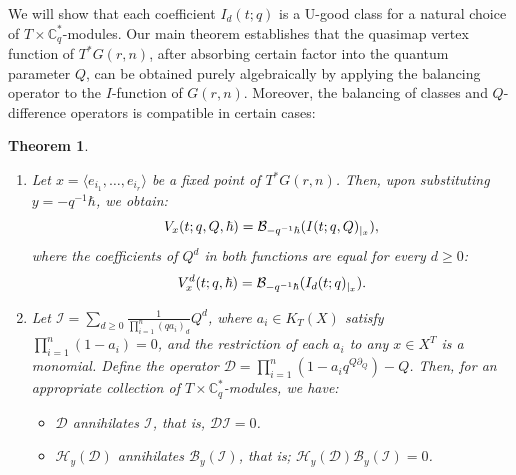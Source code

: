\documentclass{amsart}
\newtheorem{thm}{Theorem}[section]
\begin{document}
We will show that each coefficient $I_d(t;q)$ is a U-good class for a natural choice of $T \times \mathbb{C}^*_q$-modules. Our main theorem establishes that the quasimap vertex function of $T^*G(r,n)$, after absorbing certain factor into the quantum parameter $Q$, can be obtained purely algebraically by applying the balancing operator to the $I$-function of $G(r,n)$. Moreover, the balancing of classes and $Q$-difference operators is compatible in certain cases:
\begin{thm} 
\begin{enumerate}
    \item 
 Let  $x=\langle e_{i_1}, \dots, e_{i_r} \rangle$ be a fixed point of $T^*G(r,n)$. Then, upon substituting $y=-q^{-1}\hbar$, we obtain: 
    \[
    V_x(t;q,Q,\hbar) = \mathcal{B}_{-q^{-1}\hbar}(I(t;q,Q)_{\arrowvert_{x}}) ,
    \]
    where the coefficients of $Q^d$ in both functions are equal for every $d \geq 0$:
    \[
    V_x^d(t;q,\hbar) = \mathcal{B}_{-q^{-1}\hbar}(I_d(t;q)_{\arrowvert_{x}}).
    \]
    \item Let $\mathcal{I} = \sum_{d \geq 0}\frac{1}{\prod_{i=1}^n(qa_i)_d}Q^d$, where $a_i \in K_T(X)$ satisfy $\prod_{i=1}^n(1 - a_i) = 0$, and the restriction of each $a_i$ to any $x \in X^T$ is a monomial. Define the operator $\mathcal{D} =\prod_{i=1}^n (1 - a_iq^{Q\partial _Q}) - Q$. Then, for an appropriate collection of $T \times \mathbb{C}^*_q$-modules, we have:
    \begin{itemize}
        \item $\mathcal{D}$ annihilates $\mathcal{I}$, that is, $\mathcal{D} \mathcal{I} = 0$.
        \item $\mathcal{H}_y(\mathcal{D})$ annihilates $\mathcal{B}_y(\mathcal{I})$, that is; $\mathcal{H}_y(\mathcal{D}) \mathcal{B}_y(\mathcal{I})=0$.
    \end{itemize}
    

    \end{enumerate}
 \end{thm}
\end{document}
